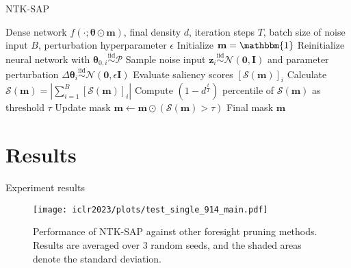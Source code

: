 \documentclass{beamer}
\begin{document}
\begin{frame}{NTK-SAP}
\begin{algorithm}[H]
\caption{Neural Tagent Kernel Spectrum-Aware Pruning (NTK-SAP)}
\begin{algorithmic}[1]
{\tiny
\REQUIRE Dense network $f(\cdot; \boldsymbol{\theta} \odot \mathbf{m})$, final density $d$, iteration steps $T$, batch size of noise input $B$, perturbation hyperparameter $\epsilon$
\STATE Initialize $\mathbf{m}=\mathbbm{1}$
    \STATE Reinitialize neural network with $\boldsymbol{\theta}_{0,i} \overset{\mathrm{iid}}{\sim} \mathcal{P}$
    \STATE Sample noise input $\mathbf{z}_{i} \overset{\mathrm{iid}}{\sim} \mathcal{N}(\textbf{0},\textbf{I})$ and parameter perturbation $\Delta \boldsymbol{\theta}_{i} \overset{\mathrm{iid}}{\sim} \mathcal{N}(\textbf{0},\epsilon\textbf{I})$
    \STATE Evaluate saliency scores $\left[\mathcal{S}(\mathbf{m})\right]_i$
 \ENDFOR
 \STATE Calculate $\mathcal{S}(\mathbf{m})=\left|\sum_{i=1}^B\left[\mathcal{S}(\mathbf{m})\right]_i\right|$ 
 \STATE Compute $(1-d^{\frac{t}{T}})$ percentile of $\mathcal{S}(\mathbf{m})$ as threshold $\tau$
 \STATE Update mask $\mathbf{m} \leftarrow \mathbf{m} \odot (\mathcal{S}(\mathbf{m})>\tau) $
\ENDFOR
\RETURN Final mask $\mathbf{m}$
}
\end{algorithmic}
\end{algorithm}
\end{frame}

\section{Results}
\begin{frame}{Experiment results}
    \begin{figure}
  \centering
    \texttt{[image: iclr2023/plots/test\_single\_914\_main.pdf]}
   \caption{Performance of NTK-SAP against other foresight pruning methods. Results are averaged over 3 random seeds, and the shaded areas denote the standard deviation.}
\end{figure}
\end{frame}
\end{document}
